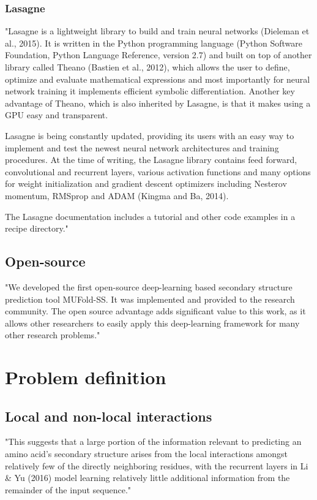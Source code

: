 \documentclass[]{scrartcl}
\begin{document}
\subsubsection{Lasagne}
"Lasagne is a lightweight library to build and train neural networks (Dieleman et al., 2015). It is written in the Python programming language (Python Software Foundation, Python Language Reference, version 2.7) and built on top of another library called Theano (Bastien et al., 2012), which allows the user to define, optimize and evaluate mathematical expressions and most importantly for neural network training it implements efficient symbolic differentiation. Another key advantage of Theano, which is also inherited by Lasagne, is that it makes using a GPU easy and transparent.

Lasagne is being constantly updated, providing its users with an easy way to implement and test the newest neural network architectures and training procedures. At the time of writing, the Lasagne library contains feed forward, convolutional and recurrent layers, various activation functions and many options for weight initialization and gradient descent optimizers including Nesterov momentum, RMSprop and ADAM (Kingma and Ba, 2014). 

The Lasagne documentation includes a tutorial and other code examples in a recipe directory." \cite{Jurtz2017}

\subsection{Open-source}
"We developed the first open-source deep-learning based secondary structure prediction tool MUFold-SS. It was implemented and provided to the research community. The open source advantage adds significant value to this work, as it allows other researchers to easily apply this deep-learning framework for many other research problems." \cite{Fang2017}


\section{Problem definition}
\subsection{Local and non-local interactions}
"This suggests that a large portion of the information relevant to predicting an amino acid’s secondary structure arises from the local interactions amongst relatively few of the directly neighboring residues, with the recurrent layers in Li \& Yu (2016) model learning relatively little additional information from the remainder of the input sequence." \cite{Busia2017}
\end{document}

